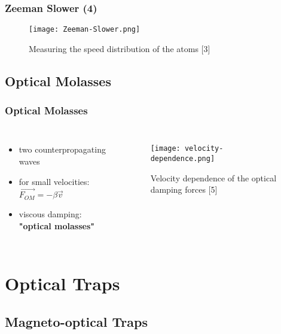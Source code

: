 \documentclass[aspectratio=169]{beamer}
\begin{document}
\begin{frame}
  \frametitle{Zeeman Slower (4)}
  \begin{figure}
    \centering
    \texttt{[image: Zeeman-Slower.png]}
    \caption{Measuring the speed distribution of the atoms [3]}
  \end{figure}
\end{frame}

\subsection{Optical Molasses}

\begin{frame}
  \frametitle{Optical Molasses}
  \begin{columns}
    \begin{itemize}
      \item two counterpropagating waves
      \item for small velocities: $\vec{F_{OM}} = - \beta \vec{v}$
      \item viscous damping: \textbf{"optical molasses"}
    \end{itemize}
    
     \begin{figure}
       \centering
       \texttt{[image: velocity-dependence.png]}
       \caption{Velocity dependence of the optical damping forces [5]}
     \end{figure} 
  \end{columns}
\end{frame}

\section{Optical Traps}

\subsection{Magneto-optical Traps}
\end{document}
